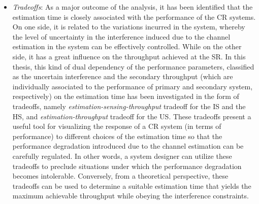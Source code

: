 \begin{itemize}
\item \textit{Tradeoffs}: 
As a major outcome of the analysis, it has been identified that the estimation time is closely associated with the performance of the CR systems. On one side, it is related to the variations incurred in the system, whereby the level of uncertainty in the interference induced due to the channel estimation in the system can be effectively controlled. While on the other side, it has a great influence on the throughput achieved at the SR. In this thesis, this kind of dual dependency of the performance parameters, classified as the uncertain interference and the secondary throughput (which are individually associated to the performance of primary and secondary system, respectively) on the estimation time has been investigated in the form of tradeoffs, namely \textit{estimation-sensing-throughput} tradeoff for the IS and the HS, and \textit{estimation-throughput} tradeoff for the US. These tradeoffs present a useful tool for visualizing the response of a CR system (in terms of performance) to different choices of the estimation time so that the performance degradation introduced due to the channel estimation can be carefully regulated. In other words, a system designer can utilize these tradeoffs to preclude situations under which the performance degradation becomes intolerable. Conversely, from a theoretical perspective, these tradeoffs can be used to determine a suitable estimation time that yields the maximum achievable throughput while obeying the interference constraints.
 

\end{itemize}
